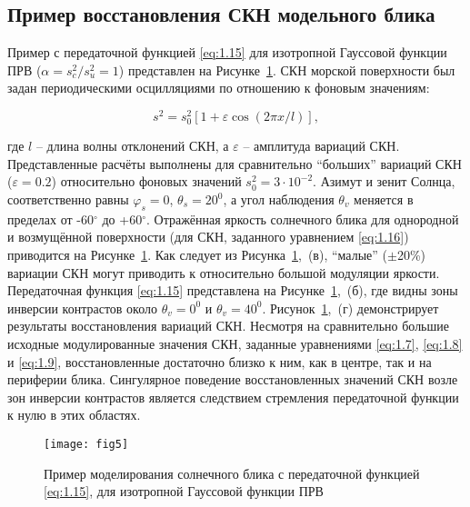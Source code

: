 \subsection{Пример восстановления СКН модельного блика}

Пример с передаточной функцией \eqref{eq:1.15} для изотропной Гауссовой функции ПРВ ($\alpha =s_{c}^{2} /s_{u}^{2} =1$) представлен на Рисунке~\ref{fig:5}. СКН морской поверхности был задан периодическими осцилляциями по отношению к фоновым значениям:


\begin{equation} \label{eq:1.16} 
s^{2} =s_{0}^{2} \left[1+\varepsilon \cos (2\pi x/l)\right],  
\end{equation} 


\noindent где $l$ -- длина волны отклонений СКН, а $\varepsilon $ -- амплитуда вариаций СКН. Представленные расчёты выполнены для сравнительно ``больших'' вариаций СКН ($\varepsilon =0.2$) относительно фоновых значений $s_{0}^{2} =3\cdot 10^{-2} $. Азимут и зенит Солнца, соответственно равны $\varphi _{s} =0$, $\theta _{s} =20^{0} $, а угол наблюдения $\theta _{v} $ меняется в пределах от -60${}^\circ$ до +60${}^\circ$. Отражённая яркость солнечного блика для однородной и возмущённой поверхности (для СКН, заданного уравнением \eqref{eq:1.16}) приводится на Рисунке~\ref{fig:5}. Как следует из Рисунка~\ref{fig:5},~(в), ``малые'' ($\pm$20\%) вариации СКН могут приводить к относительно большой модуляции яркости. Передаточная функция \eqref{eq:1.15} представлена на Рисунке~\ref{fig:5},~(б), где видны зоны инверсии контрастов около $\theta _{v} =0^{0} $ и $\theta _{v} =40^{0} $. Рисунок~\ref{fig:5},~(г) демонстрирует результаты восстановления вариаций СКН. Несмотря на сравнительно большие исходные модулированные значения СКН, заданные уравнениями \eqref{eq:1.7}, \eqref{eq:1.8} и \eqref{eq:1.9}, восстановленные достаточно близко к ним, как в центре, так и на периферии блика. Сингулярное поведение восстановленных значений СКН возле зон инверсии контрастов является следствием стремления передаточной функции к нулю в этих областях.



\begin{figure}[!thb]
    \texttt{[image: fig5]}
    \caption{Пример моделирования солнечного блика с передаточной функцией \eqref{eq:1.15}, для изотропной Гауссовой функции ПРВ}
    \label{fig:5}
\end{figure}



